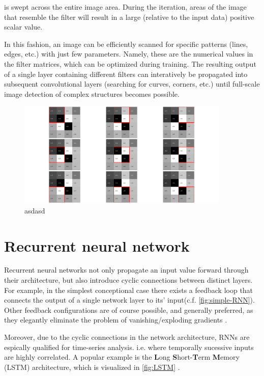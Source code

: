 is swept across the entire image area. During the iteration, areas of the image that resemble the filter will result in a large (relative to the input data)
positive scalar value.

In this fashion, an image can be efficiently scanned for specific patterns (lines, edges, etc.) with just few parameters. Namely, these are the numerical
values in the filter matrices, which can be optimized during training. The resulting output of a single layer containing different filters can interatively 
be propagated into subsequent convolutional layers (searching for curves, corners, etc.) until full-scale image detection of complex structures becomes possible.

\begin{figure}
	\centering
	\includegraphics[width=0.9\textwidth]{imgs/convolution.png}
	\caption{asdasd \label{fig:convolution}}
\end{figure}

\section{Recurrent neural network}
\label{sec:RNN}

Recurrent neural networks not only propagate an input value forward through their architecture, but also introduce cyclic connections between distinct layers. For
example, in the simplest conceptional case there exists a feedback loop that connects the output of a single network layer to its' input(c.f. 
\autoref{fig:simple-RNN}). Other feedback configurations are of course possible, and generally preferred, as they elegantly eliminate the problem of 
vanishing/exploding gradients \cite{hochreiter1991untersuchungen}. 

Moreover, due to the cyclic connections in the network architecture, RNNs are espically qualified for time-series analysis. i.e. where temporally sucessive inputs
are highly correlated. A popular example is the \textbf{L}ong \textbf{S}hort-\textbf{T}erm \textbf{M}emory (LSTM) architecture, which is visualized in 
\autoref{fig:LSTM} \TODO.

